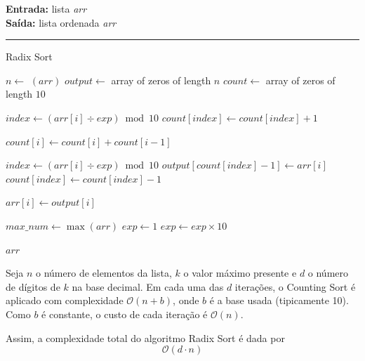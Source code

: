 \documentclass[conference]{IEEEtran}
\begin{document}
\begin{algorithm}[H]
    \raggedright
    \vspace{.1em}
    \textbf{Entrada:} lista \textit{arr} \\
    \textbf{Saída:} lista ordenada \textit{arr} \\
    \vspace{.5em}
    \hrule 
    \caption{Radix Sort}
    \begin{algorithmic}[1]
            \State $n \gets$ $(arr)$
            \State $output \gets$ array of zeros of length $n$
            \State $count \gets$ array of zeros of length $10$
    
                \State $index \gets (arr[i] \div exp) \bmod 10$
                \State $count[index] \gets count[index] + 1$
            \EndFor
    
                \State $count[i] \gets count[i] + count[i - 1]$
            \EndFor
    
                \State $index \gets (arr[i] \div exp) \bmod 10$
                \State $output[count[index] - 1] \gets arr[i]$
                \State $count[index] \gets count[index] - 1$
            \EndFor
    
                \State $arr[i] \gets output[i]$
            \EndFor
        \EndFunction
    
        \State $max\_num \gets \max(arr)$
        \State $exp \gets 1$
            \State {}
            \State $exp \gets exp \times 10$
        \EndWhile
    
        \State \Return $arr$
    \end{algorithmic}
\end{algorithm}

Seja \( n \) o número de elementos da lista, \( k \) o valor máximo presente e \( d \) o número de dígitos de \( k \) na base decimal. Em cada uma das \( d \) iterações, o Counting Sort é aplicado com complexidade \(\mathcal{O}(n + b)\), onde \( b \) é a base usada (tipicamente 10). Como \( b \) é constante, o custo de cada iteração é \(\mathcal{O}(n)\).

Assim, a complexidade total do algoritmo Radix Sort é dada por
\[
\mathcal{O}(d \cdot n)
\]
\end{document}
